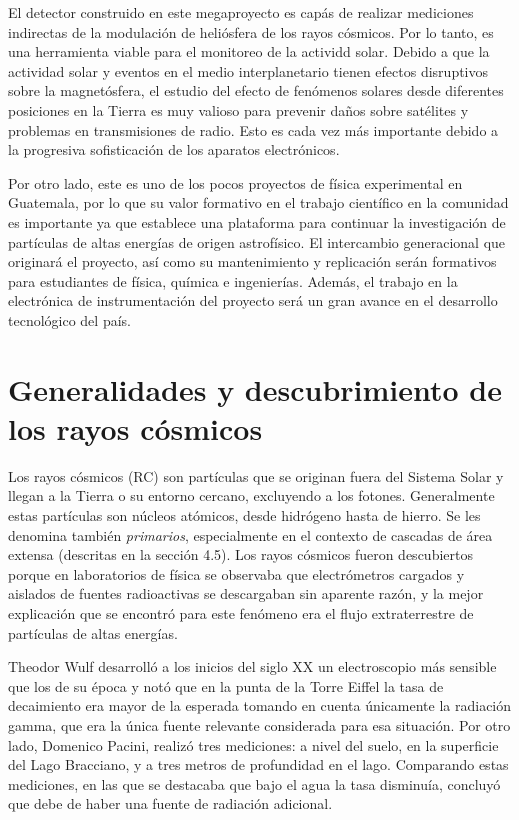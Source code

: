 \documentclass{book}
\begin{document}


El detector construido en este megaproyecto es cap\'as de realizar mediciones indirectas de la modulaci\'on de heli\'osfera de los rayos c\'osmicos. Por lo tanto, es una herramienta viable para el monitoreo de la actividd solar. Debido a que la actividad solar y eventos en el medio interplanetario tienen efectos disruptivos sobre la magnet\'osfera, el estudio del efecto de fen\'omenos solares desde diferentes posiciones en la Tierra es muy valioso para prevenir da\~nos sobre sat\'elites y problemas en transmisiones de radio. Esto es cada vez m\'as importante debido a la progresiva sofisticaci\'on de los aparatos electr\'onicos.

Por otro lado, este es uno de los pocos proyectos de f\'isica experimental en Guatemala, por lo que su valor formativo en el trabajo cient\'ifico en la comunidad es importante ya que establece una plataforma para continuar la investigaci\'on de part\'iculas de altas energ\'ias de origen astrof\'isico. El intercambio generacional que originar\'a el proyecto, as\'i como su mantenimiento y replicaci\'on ser\'an formativos para estudiantes de f\'isica, qu\'imica e ingenier\'ias. Adem\'as, el trabajo en la electr\'onica de instrumentaci\'on del proyecto ser\'a un gran avance en el desarrollo tecnol\'ogico del pa\'is.


\section{Generalidades y descubrimiento de los rayos c\'osmicos}
Los rayos c\'osmicos (RC) son part\'iculas que se originan fuera del Sistema Solar y llegan a la Tierra o su entorno cercano, excluyendo a los fotones. Generalmente estas part\'iculas son n\'ucleos at\'omicos, desde hidr\'ogeno hasta de hierro. Se les denomina tambi\'en \textit{primarios}, especialmente en el contexto de cascadas de \'area extensa (descritas en la secci\'on 4.5). Los rayos c\'osmicos fueron descubiertos porque en laboratorios de f\'isica se observaba que electr\'ometros cargados y aislados de fuentes radioactivas se descargaban sin aparente raz\'on, y la mejor explicaci\'on que se encontr\'o para este fen\'omeno era el flujo extraterrestre de part\'iculas de altas energ\'ias. \citep{ASOREY}

Theodor Wulf desarroll\'o a los inicios del siglo XX un electroscopio m\'as sensible que los de su \'epoca y not\'o que en la punta de la Torre Eiffel la tasa de decaimiento era mayor de la esperada tomando en cuenta \'unicamente la radiaci\'on gamma, que era la \'unica fuente relevante considerada para esa situaci\'on. Por otro lado, Domenico Pacini, realiz\'o tres mediciones: a nivel del suelo, en la superficie del Lago Bracciano, y a tres metros de profundidad en el lago. Comparando estas mediciones, en las que se destacaba que bajo el agua la tasa disminu\'ia, concluy\'o que debe de haber una fuente de radiaci\'on adicional. \citep{ASOREY}
\end{document}
